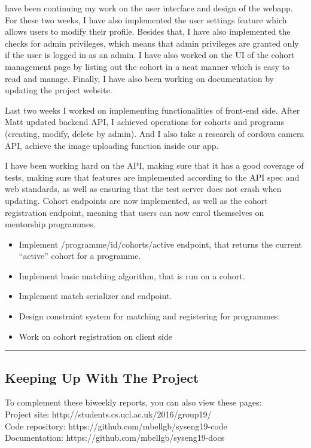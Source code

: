 \documentclass[11pt]{report}
\begin{document}
\bigskip
{}
\smallskip

\noindent
 have been continuing my work on the user interface and design of the webapp.
 For these two weeks, I have also implemented the user settings feature which
 allows users to modify their profile. Besides that, I have also implemented the
 checks for admin privileges, which means that admin privileges are granted only
 if the user is logged in as an admin. I have also worked on the UI of the
 cohort management page by listing out the cohort in a neat manner which is easy
 to read and manage. Finally, I have also been working on documentation by
 updating the project website.

\bigskip
{}
\smallskip

\noindent
Last two weeks I worked on implementing functionalities of front-end side. After
Matt updated backend API, I achieved operations for cohorts and programs
(creating, modify, delete by admin). And I also take a research of cordova
camera API, achieve the image uploading function inside our app.

\bigskip
{}
\smallskip

\noindent
I have been working hard on the API, making sure that it has a good coverage of
tests, making sure that features are implemented according to the API spec and
web standards, as well as ensuring that the test server does not crash when
updating. Cohort endpoints are now implemented, as well as the cohort
registration endpoint, meaning that users can now enrol themselves on mentorship
programmes.

\bigskip
{}
\smallskip

\noindent
\begin{itemize}
    \item Implement /programme/{id}/cohorts/active endpoint, that returns the
        current “active” cohort for a programme.
    \item Implement basic matching algorithm, that is run on a cohort.
    \item Implement match serializer and endpoint.
    \item Design constraint system for matching and registering for programmes.
    \item Work on cohort registration on client side
\end{itemize}

\hrule

\subsection*{Keeping Up With The Project}

To complement these biweekly reports, you can also view these pages:\\

\noindent
Project site: http://students.cs.ucl.ac.uk/2016/group19/\\

\noindent
Code repository: https://github.com/mbellgb/syseng19-code\\

\noindent
Documentation: https://github.com/mbellgb/syseng19-docs
\end{document}
